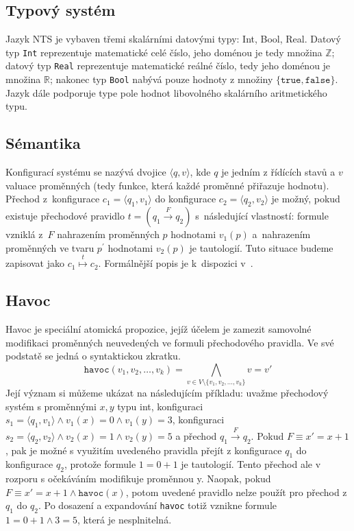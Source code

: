 \documentclass[12pt]{fithesis2}
\newcommand{\tuple}[1]{\langle #1 \rangle}
\begin{document}
\subsection{Typový systém}
Jazyk NTS je vybaven třemi skalárními datovými typy: Int, Bool, Real. Datový typ \texttt{Int} reprezentuje matematické celé číslo, jeho doménou je tedy množina $\mathbb{Z}$; datový typ \texttt{Real} reprezentuje matematické reálné číslo, tedy jeho doménou je množina $\mathbb{R}$; nakonec typ \texttt{Bool} nabývá pouze hodnoty z množiny $\{ \texttt{true}, \texttt{false} \}$. Jazyk dále podporuje type pole hodnot libovolného skalárního aritmetického typu.

\subsection{Sémantika}
\label{subsec:nts-configuration}

\newcommand{\rulemapsto}[1]{\overset{#1}{\mapsto}}
Konfigurací systému se nazývá dvojice $\tuple{q, v}$, kde $q$ je jedním z řídících stavů a $v$ valuace proměnných (tedy funkce, která každé proměnné přiřazuje hodnotu). Přechod z~konfigurace $c_1 = \tuple{q_1, v_1}$ do konfigurace $c_2 = \tuple{q_2, v_2}$ je možný, pokud existuje přechodové pravidlo $t = \left({q_1 \overset{F}{\rightarrow} q_2}\right)$ s~následující vlastností: formule vzniklá z~$F$ nahrazením proměnných $p$ hodnotami $v_1(p)$ a~nahrazením proměnných ve tvaru $p^\prime$ hodnotami $v_2(p)$ je tautologií. Tuto situace budeme zapisovat jako $c_1 \rulemapsto{t} c_2$. Formálnější popis je k~dispozici v~\cite{NTSref}.

\subsection{Havoc}
\label{subsec:nts-havoc}
Havoc je speciální atomická propozice, jejíž účelem je zamezit samovolné modifikaci proměnných neuvedených ve formuli přechodového pravidla. Ve své podstatě se jedná o syntaktickou zkratku.
\begin{equation}
\texttt{havoc} \left( v_1, v_2, \ldots, v_k \right) = \bigwedge_{v \in V \setminus \{ v_1, v_2, \ldots, v_k \}} v = v\prime
\end{equation}
Její význam si můžeme ukázat na následujícím příkladu: uvažme přechodový systém s proměnnými $x,y$ typu int, konfiguraci $s_1 = \tuple{q_1, v_1} \land v_1(x) = 0 \land v_1(y) = 3$, konfiguraci $s_2 = \tuple{q_2, v_2} \land v_2(x) = 1 \land v_2(y) = 5$ a přechod $q_1 \overset{F}{\rightarrow} q_2$. Pokud $F \equiv x' = x + 1$, pak je možné s využitím uvedeného pravidla přejít z konfigurace $q_1$ do konfigurace $q_2$, protože formule $1 = 0 + 1$ je tautologií. Tento přechod ale v rozporu s očekáváním modifikuje proměnnou y. Naopak, pokud $F \equiv x' = x + 1 \land \texttt{havoc}(x)$, potom uvedené pravidlo nelze použít pro přechod z $q_1$ do $q_2$. Po dosazení a expandování \texttt{havoc} totiž vznikne formule $1 = 0 + 1 \land 3 = 5$, která je nesplnitelná.
\end{document}
